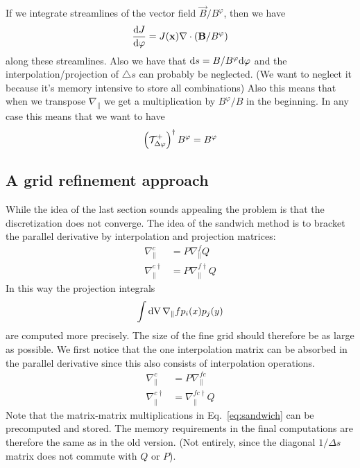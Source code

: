 If we integrate streamlines of the vector field $\vec B/B^\varphi$, then we have
\begin{align}
    \frac{\mathrm{d} J}{\mathrm{d} \varphi} = J({\mathbf{x}} ) \nabla\cdot\left( {\mathbf{B}}/B^\varphi\right)
    \label{}
\end{align}
along these streamlines.
Also we have that $\mathrm{d} s = B/B^\varphi \mathrm{d} \varphi $ and the interpolation/projection of $\triangle s$ can probably be neglected. (We want to neglect it because it's memory intensive to store all combinations)
Also this means that when we transpose $\nabla_\parallel$ we get a 
multiplication by $B^\varphi/B$ in the beginning.
In any case this means that we want to have 
\begin{align}
\left(\mathcal T^+_{\Delta\varphi}\right)^\dagger B^\varphi  =  B^\varphi
\end{align}


\subsection{A grid refinement approach}
While the idea of the last section sounds appealing the problem 
is that the discretization does not converge.
The idea of the sandwich method \cite{Stegmeir2016} is 
to bracket the parallel derivative by interpolation and 
projection matrices:
\begin{align}
    \nabla^c_\parallel &= P\nabla_\parallel^f Q \\
    \nabla^{c\dagger}_\parallel &= P \nabla^{f\dagger}_\parallel Q
    \label{eq:sandwich}
\end{align}
In this way the projection integrals
\begin{align}
    \int\mathrm{dV}\, \nabla_\parallel f p_i(x)p_j(y) 
    \label{}
\end{align}
are computed more precisely.
The size of the fine grid should therefore be as large as
possible.
We first notice that the one interpolation matrix can be absorbed
in the parallel derivative since this also consists of 
interpolation operations. 
\begin{align}
    \nabla^c_\parallel &= P\nabla_\parallel^{fc} \\
    \nabla^{c\dagger}_\parallel &= \nabla^{fc\dagger}_\parallel Q
    \label{eq:sandwich}
\end{align}
Note that the matrix-matrix multiplications in Eq.~\eqref{eq:sandwich} can
be precomputed and stored. The memory requirements 
in the final computations are 
therefore the same  as in the old version. (Not entirely, since
the diagonal $1/\Delta s$ matrix does not commute with $Q$ or $P$).

